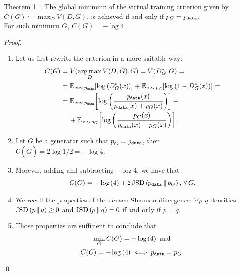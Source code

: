 \documentclass{beamer}
\begin{document}
	\begin{frame}
		\begin{block}{Theorem 1 \hfill [\citeauthor{goodfellow2014}]}
			The global minimum of the virtual training criterion given by $C(G) \coloneqq \max_D V(D, G)$, is achieved if and only if $p_G = p_\text{\texttt{data}}$. \\ 
			For such minimum $G$, $C(G) = -\log{4}$.
		\end{block}
		\textit{Proof.} 
		\begin{enumerate}
			\item Let us first rewrite the criterion in a more suitable way:
				\vspace{-0.2cm}
				\begin{align*}
					C(G) & = V(\argmax_D V(D, G), G) = V(D^*_G, G) = \\
					& = \mean[x \sim p_\text{\texttt{data}}]{\log{D^*_G(x)}} + \mean[z \sim p_G]{\log{1 - D^*_G(x)}} = \\
					& = \mean[x \sim p_\text{\texttt{data}}]{\log{\frac{p_\text{\texttt{data}}(x)}{p_\text{\texttt{data}}(x) + p_G(x)}}} + \\
					& \kern12.2pt + \mean[z \sim p_G]{\log{\frac{p_G(x)}{p_\text{\texttt{data}}(x) + p_G(x)}}}.
				\end{align*}
		\end{enumerate}
	\end{frame}

	\begin{frame}
		\begin{enumerate}\setcounter{enumi}{1}
			\item Let $\tilde{G}$ be a generator such that $p_{\tilde{G}} = p_\text{\texttt{data}}$, then $C(\tilde{G}) = 2 \log{1/2} = -\log{4}$.
			\item Morever, adding and subtracting $-\log{4}$, we have that
				\vspace{-0.2cm}
				\begin{equation*}
					C(G) = -\log{4} + 2 \jsd{p_\text{\texttt{data}} \,\|\, p_G}, \, \forall G.
				\end{equation*}
			\item We recall the properties of the Jensen-Shannon divergence: $\forall p, q$ densities $\jsd{p \,\|\, q} \geq 0$ and $\jsd{p \,\|\, q} = 0$ if and only if $p = q$.
			\item Those properties are sufficient to conclude that 
				\vspace{-0.2cm}
				\begin{gather*}
					\min_G C(G) = -\log{4} \text{ and} \\
					C(G) = -\log{4} \iff p_\text{\texttt{data}} = p_G.
				\end{gather*}
		\end{enumerate}
		\qed
	\end{frame}
\end{document}
